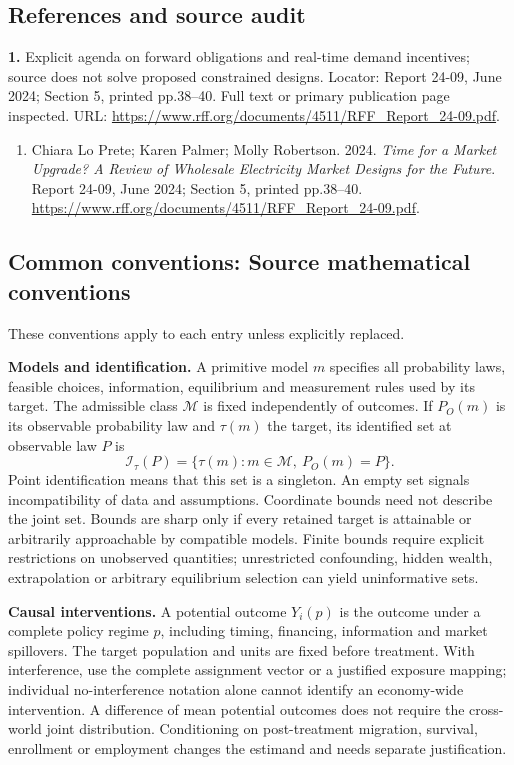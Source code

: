 \documentclass[11pt,a4paper]{article}
\begin{document}
\subsection*{References and source audit}
\textbf{1.} Explicit agenda on forward obligations and real-time demand incentives; source does not solve proposed constrained designs. Locator: Report 24-09, June 2024; Section 5, printed pp.38–40. Full text or primary publication page inspected. URL: \url{https://www.rff.org/documents/4511/RFF_Report_24-09.pdf}.
\begin{enumerate}\raggedright
\item\hypertarget{definitions:source:30007720:1}{} Chiara Lo Prete; Karen Palmer; Molly Robertson. 2024. \emph{Time for a Market Upgrade? A Review of Wholesale Electricity Market Designs for the Future}. Report 24-09, June 2024; Section 5, printed pp.38–40.
\url{https://www.rff.org/documents/4511/RFF_Report_24-09.pdf}.
\end{enumerate}

\subsection*{Common conventions: Source mathematical conventions}

These conventions apply to each entry unless explicitly replaced.

\textbf{Models and identification.} A primitive model \(m\) specifies all probability laws, feasible choices, information, equilibrium and measurement rules used by its target. The admissible class \(\mathcal M\) is fixed independently of outcomes. If \(P_O(m)\) is its observable probability law and \(\tau(m)\) the target, its identified set at observable law \(P\) is
\[
 \mathcal I_\tau(P)=\{\tau(m):m\in\mathcal M,\ P_O(m)=P\}.
\]
Point identification means that this set is a singleton. An empty set signals incompatibility of data and assumptions. Coordinate bounds need not describe the joint set. Bounds are sharp only if every retained target is attainable or arbitrarily approachable by compatible models. Finite bounds require explicit restrictions on unobserved quantities; unrestricted confounding, hidden wealth, extrapolation or arbitrary equilibrium selection can yield uninformative sets.

\textbf{Causal interventions.} A potential outcome \(Y_i(p)\) is the outcome under a complete policy regime \(p\), including timing, financing, information and market spillovers. The target population and units are fixed before treatment. With interference, use the complete assignment vector or a justified exposure mapping; individual no-interference notation alone cannot identify an economy-wide intervention. A difference of mean potential outcomes does not require the cross-world joint distribution. Conditioning on post-treatment migration, survival, enrollment or employment changes the estimand and needs separate justification.
\end{document}
